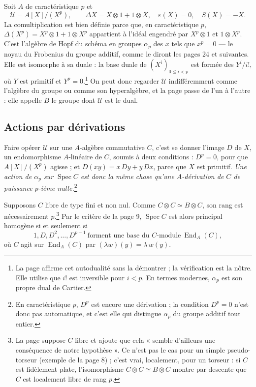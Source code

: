 \documentclass[11pt,a4paper]{article}
\begin{document}
Soit $A$ de caractéristique $p$ et
\[
\mathcal{U} = A[X]/(X^p),
\qquad \Delta X = X \otimes 1 + 1 \otimes X,
\quad \varepsilon(X) = 0,
\quad S(X) = -X .
\]
La comultiplication est bien définie parce que, en caractéristique $p$,
$\Delta(X^p) = X^p \otimes 1 + 1 \otimes X^p$ appartient à l'idéal engendré
par $X^p \otimes 1$ et $1 \otimes X^p$. C'est l'algèbre de Hopf du schéma en
groupes $\alpha_p$ des $x$ tels que $x^p = 0$ --- le noyau du Frobenius du
groupe additif, comme le diront les pages 24 et suivantes. Elle est isomorphe
à sa duale : la base duale de $(X^i)_{0 \le i < p}$ est formée des
$Y^i / i!$, où $Y$ est primitif et $Y^p = 0$.\footnote{La page affirme cet
autodualité sans la démontrer ; la vérification est la nôtre. Elle utilise
que $i!$ est inversible pour $i < p$. En termes modernes, $\alpha_p$ est son
propre dual de Cartier.} On peut donc regarder $\mathcal{U}$ indifféremment
comme l'algèbre du groupe ou comme son hyperalgèbre, et la page passe de l'un
à l'autre : elle appelle $B$ le groupe dont $\mathcal{U}$ est le dual.

\subsection*{Actions par dérivations}

Faire opérer $\mathcal{U}$ sur une $A$-algèbre commutative $C$, c'est se
donner l'image $D$ de $X$, un endomorphisme $A$-linéaire de $C$, soumis à deux
conditions : $D^p = 0$, pour que $A[X]/(X^p)$ agisse ; et $D(xy) = x\,Dy +
y\,Dx$, parce que $X$ est primitif. \emph{Une action de $\alpha_p$ sur
$\operatorname{Spec} C$ est donc la même chose qu'une $A$-dérivation de $C$
de puissance $p$-ième nulle.}\footnote{En caractéristique $p$, $D^p$ est
encore une dérivation ; la condition $D^p = 0$ n'est donc pas automatique,
et c'est elle qui distingue $\alpha_p$ du groupe additif tout entier.}

Supposons $C$ libre de type fini et non nul. Comme $C \otimes C \simeq B
\otimes C$, son rang est nécessairement $p$.\footnote{La page suppose $C$
libre et ajoute que cela « semble d'ailleurs une conséquence de notre
hypothèse ». Ce n'est pas le cas pour un simple pseudo-torseur (exemple de la
page 8) ; c'est vrai, localement, pour un torseur : si $C$ est fidèlement
plate, l'isomorphisme $C \otimes C \simeq B \otimes C$ montre par descente
que $C$ est localement libre de rang $p$.} Par le critère de la page 9,
$\operatorname{Spec} C$ est alors principal homogène si et seulement si
\[
1, D, D^2, \ldots, D^{p-1} \ \text{forment une base du $C$-module}\
\operatorname{End}_A(C),
\]
où $C$ agit sur $\operatorname{End}_A(C)$ par $(\lambda w)(y) = \lambda\,
w(y)$.
\end{document}
